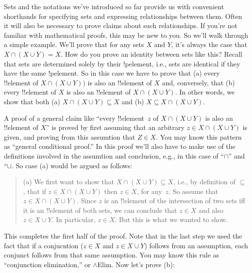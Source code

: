 \documentclass[../../include/open-logic-section]{subfiles}
\begin{document}

\begin{explain}
Sets and the notations we've introduced so far provide us with
convenient shorthands for specifying sets and expressing relationships
between them. Often it will also be necessary to prove claims about
such relationships.  If you're not familiar with mathematical proofs,
this may be new to you. So we'll walk through a simple example.  We'll
prove that for any sets $X$ and $Y$, it's always the case that $X \cap
(X \cup Y) = X$.  How do you prove an identity between sets like this?
Recall that sets are determined solely by their !p{element}, i.e.,
sets are identical if they have the same !p{element}.  So in this
case we have to prove that (a) every !!{element} of $X \cap (X \cup
Y))$ is also an !!{element} of $X$ and, conversely, that (b) every
!!{element} of $X$ is also an !!{element} of $X \cap (X \cup Y)$. In
other words, we show that both (a) $X \cap (X \cup Y) \subseteq X$ and
(b) $X \subseteq X \cap (X \cup Y)$.

A proof of a general claim like ``every !!{element}~$z$ of $X \cap (X
\cup Y)$ is also an !!{element} of $X$'' is proved by first assuming
that an arbitrary $z \in X \cap (X \cup Y)$ is given, and proving from
this assumtion that $Z \in X$. You may know this pattern as ``general
conditional proof.''  In this proof we'll also have to make use of the
definitions involved in the assumtion and conclusion, e.g., in this
case of ``$\cap$'' and ``$\cup$.  So case (a) would be argued as
follows:

\begin{quote}
(a) We first want to show that $X \cap (X \cup Y) \subseteq X$, i.e.,
by definition of $\subseteq$, that if $z \in X \cap (X \cup Y)$ then
$z \in X$, for any~$z$.  So assume that $z \in X \cap (X \cup
Y)$. Since $z$ is an !!{element} of the intersection of two sets iff
it is an !!{element} of both sets, we can conclude that $z \in X$ and
also $z \in X \cup Y$.  In particular, $z \in X$. But this is what
we wanted to show.
\end{quote}

This completes the first half of the proof.  Note that in the last
step we used the fact that if a conjucntion ($z \in X$ and $z \in X
\cup Y$) follows from an assumption, each conjunct follows from that
same assumption. You may know this rule as ``conjunction
elimination,'' or $\land$Elim. Now let's prove (b):


\end{explain}
\end{document}
